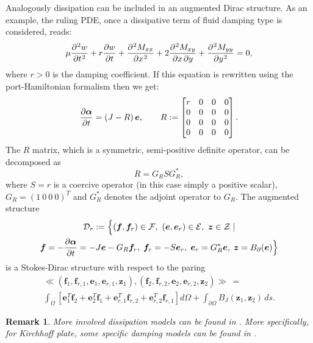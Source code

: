 \documentclass[preprint,12pt]{elsarticle}
\newtheorem{remark}{Remark}
\begin{document}
	Analogously dissipation can be included in an augmented Dirac structure. As an example, the ruling PDE, once a dissipative term of fluid damping type is considered, reads:
	\begin{equation}
	\mu \diffp[2]{w}{t}  + r \diffp{w}{t}+ \diffp[2]{M_{xx}}{x} + 2 \diffp{M_{xy}}{x,y} + \diffp[2]{M_{yy}}{y} = 0,
	\end{equation}
	where $r>0$ is the damping coefficient.
	If this equation is rewritten using the port-Hamiltonian formalism then we get:
	\begin{equation}
	\diffp{\bm\alpha}{t} = \left(J - R \right) \bm{e}, \qquad 
	R := 
	\begin{bmatrix}
	r & 0 & 0 & 0 \\
	0 & 0 & 0 & 0 \\
	0 & 0 & 0 & 0 \\
	0 & 0 & 0 & 0 \\
	\end{bmatrix}.
	\end{equation}
	The $R$ matrix, which is a symmetric, semi-positive definite operator, can be decomposed as
	\begin{equation}
	R = G_R S G_R^* , 
	\end{equation}
	where $S=r$ is a coercive operator (in this case simply a positive scalar), $G_R =  \left(1 \ 0 \ 0 \ 0 \right)^T$ and $G_R^*$ denotes the adjoint operator to $G_R$. The augmented structure
	\begin{multline}
	\mathcal{D}_r := \Bigl\{ (\bm{f}, \bm{f}_r) \in \mathcal{F}, \ (\bm{e}, \bm{e}_r) \in \mathcal{E}, \ \bm{z} \in \mathcal{Z} \; |  \\
	\bm{f} = - \diffp{\bm{\alpha}}{t} = -J \bm{e} - G_R \bm{f}_r, \; \bm{f}_r = - S \bm{e}_r, \; \bm{e}_r = G^*_R \bm{e},  \;  \bm{z} = B_{\partial}(\bm{e})	
	\Big\}
	\end{multline}
	is a Stokes-Dirac structure with respect to the paring 
	\begin{multline}
	\ll (\bm{f}_1, \bm{f}_{r, 1}, \bm{e}_1, \bm{e}_{r, 1}, \bm{z}_1), (\bm{f}_2, \bm{f}_{r, 2}, \bm{e}_2, \bm{e}_{r, 2}, \bm{z}_2) \gg  \,= \\
	\int_{\Omega} \left[ \bm{e}_1^T \bm{f}_2 + \bm{e}_2^T \bm{f}_1 + \bm{e}_{r, 1}^T \bm{f}_{r, 2} + \bm{e}_{r, 2}^T \bm{f}_{r, 1} \right] d\Omega  + \int_{\partial \Omega} B_J(\bm{z}_1, \bm{z}_2) \, ds.
	\end{multline}

\begin{remark}
More involved dissipation models can be found in \cite{DissDenis}. More specifically, for Kirchhoff plate, some specific damping models can be found in \cite{LambourgJASA}.
\end{remark}	
\end{document}
